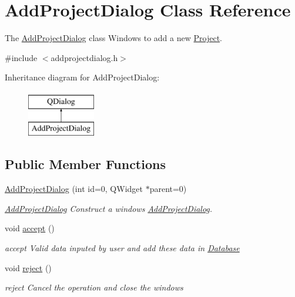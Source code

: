 \hypertarget{classAddProjectDialog}{\section{Add\-Project\-Dialog Class Reference}
\label{classAddProjectDialog}
}


The \hyperlink{classAddProjectDialog}{Add\-Project\-Dialog} class Windows to add a new \hyperlink{classProject}{Project}.  




{\ttfamily \#include $<$addprojectdialog.\-h$>$}

Inheritance diagram for Add\-Project\-Dialog\-:\begin{figure}[H]
\begin{center}
\leavevmode
\includegraphics[height=2.000000cm]{d0/d23/classAddProjectDialog}
\end{center}
\end{figure}
\subsection*{Public Member Functions}
\begin{DoxyCompactItemize}
\item 
\hyperlink{classAddProjectDialog_abb96542ad074344f634d0ff834e65f03}{Add\-Project\-Dialog} (int id=0, Q\-Widget $\ast$parent=0)
\begin{DoxyCompactList}\small\item\em \hyperlink{classAddProjectDialog}{Add\-Project\-Dialog} Construct a windows \hyperlink{classAddProjectDialog}{Add\-Project\-Dialog}. \end{DoxyCompactList}\item 
\hypertarget{classAddProjectDialog_adb873176b67a671fc417e7ab21389c21}{void \hyperlink{classAddProjectDialog_adb873176b67a671fc417e7ab21389c21}{accept} ()}\label{classAddProjectDialog_adb873176b67a671fc417e7ab21389c21}

\begin{DoxyCompactList}\small\item\em accept Valid data inputed by user and add these data in \hyperlink{classDatabase}{Database} \end{DoxyCompactList}\item 
\hypertarget{classAddProjectDialog_a3e6011001312acd234f2352f1a796f0e}{void \hyperlink{classAddProjectDialog_a3e6011001312acd234f2352f1a796f0e}{reject} ()}\label{classAddProjectDialog_a3e6011001312acd234f2352f1a796f0e}

\begin{DoxyCompactList}\small\item\em reject Cancel the operation and close the windows \end{DoxyCompactList}\end{DoxyCompactItemize}


